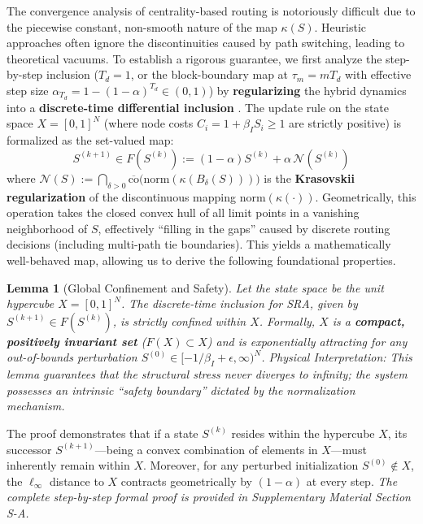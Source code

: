 \documentclass[journal]{IEEEtran}
\theoremstyle{plain}
\newtheorem{lemma}{Lemma}
\theoremstyle{definition}
\newcommand{\rev}[1]{{\color{blue}#1}}
\begin{document}
The convergence analysis of centrality-based routing is notoriously difficult due to the piecewise constant, non-smooth nature of the map $\kappa(S)$. 
Heuristic approaches often ignore the discontinuities caused by path switching, leading to theoretical vacuums.
To establish a rigorous guarantee, we first analyze the step-by-step inclusion ($T_d=1$, or the block-boundary map at $\tau_m = m T_d$ with effective step size $\alpha_{T_d} = 1 - (1-\alpha)^{T_d} \in (0,1)$) by \textbf{regularizing} the hybrid dynamics into a \textbf{discrete-time differential inclusion} \cite{Aubin1984Differential}. 
The update rule on the state space $X = [0,1]^N$ (where node costs $C_i = 1 + \beta_I S_i \ge 1$ are strictly positive) is formalized as the set-valued map:
\begin{equation}\label{eq:inclusion_map}
S^{(k+1)} \in F(S^{(k)}) := (1-\alpha)S^{(k)}+\alpha\,\mathcal{N}(S^{(k)})
\end{equation}
where $\mathcal{N}(S) := \bigcap_{\delta > 0} \overline{\mathrm{co}}\big(\mathrm{norm}(\kappa(B_\delta(S)))\big)$ is the \textbf{Krasovskii regularization} of the discontinuous mapping $\mathrm{norm}(\kappa(\cdot))$. 
Geometrically, this operation takes the closed convex hull of all limit points in a vanishing neighborhood of $S$, effectively ``filling in the gaps'' caused by discrete routing decisions (including multi-path tie boundaries). 
This yields a mathematically well-behaved map, allowing us to derive the following foundational properties.

\begin{lemma}[Global Confinement and Safety]
\label{lemma:invariance}
Let the state space be the unit hypercube $X=[0,1]^N$. 
The discrete-time inclusion for SRA, given by $S^{(k+1)}\in F(S^{(k)})$, is strictly confined within $X$. 
Formally, $X$ is a \textbf{compact, positively invariant set} ($F(X) \subset X$) and is \rev{exponentially attracting for any out-of-bounds perturbation $S^{(0)} \in [-1/\beta_I + \epsilon, \infty)^N$}.
\textit{Physical Interpretation:} This lemma guarantees that the structural stress never diverges to infinity; the system possesses an intrinsic ``safety boundary'' dictated by the normalization mechanism.
\end{lemma}
\begin{IEEEproof}
The proof demonstrates that if a state $S^{(k)}$ resides within the hypercube $X$, its successor $S^{(k+1)}$---being a convex combination of elements in $X$---must inherently remain within $X$. Moreover, for any perturbed initialization $S^{(0)} \notin X$, the $\ell_\infty$ distance to $X$ contracts geometrically by $(1-\alpha)$ at every step. \textit{The complete step-by-step formal proof is provided in Supplementary Material Section S-A.}
\end{IEEEproof}
\end{document}
